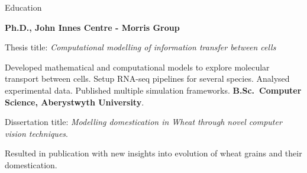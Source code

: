 \begin{rubric}{Education}

\entry*[2018 -- 2022]%
	\textbf{Ph.D., John Innes Centre - Morris Group} 
	
	Thesis title: \emph{Computational modelling of information transfer
	between cells} 

	Developed mathematical and computational models to explore molecular
	transport between cells. Setup RNA-seq pipelines for several species.
	Analysed experimental data. Published multiple simulation frameworks.
%
\entry*[2014 -- 2018]%
	\textbf{B.Sc.~Computer Science, Aberystwyth University}.

	Dissertation title: \emph{Modelling domestication in Wheat through novel
	computer vision techniques}. 
	
	Resulted in publication with new insights into evolution of wheat grains and
	their domestication.
\end{rubric}